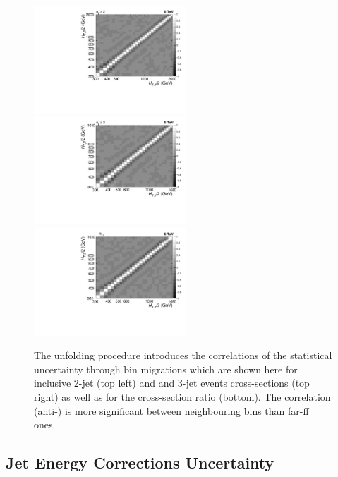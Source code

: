 \begin{figure}[!h]
 \begin{center}
 \hspace*{-3mm}\includegraphics[width=0.51\textwidth]{Plots_HT_2_150/Correlation_Matrix_NLO_2_ite4.pdf}%
 ~~\includegraphics[width=0.51\textwidth]{Plots_HT_2_150/Correlation_Matrix_NLO_3_ite4.pdf}\\
 \includegraphics[width=0.51\textwidth]{Plots_HT_2_150/Correlation_Matrix_NLO_Ratio_32_ite4.pdf}
 \caption{The unfolding procedure introduces the correlations of the statistical uncertainty through bin migrations which are shown here for inclusive 2-jet (top left) and and 3-jet events cross-sections (top right) as well as for the cross-section ratio \ratio (bottom). The correlation (anti-) is more significant between neighbouring bins than far-ff ones.}
 \label{fig:corr}
 \end{center}
\end{figure}
\subsection{Jet Energy Corrections Uncertainty}

